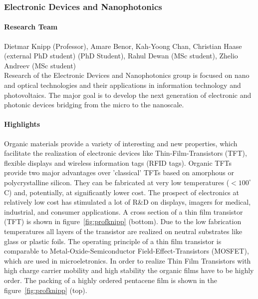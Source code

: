 \subsubsection{Electronic Devices and Nanophotonics}

\paragraph{Research Team}
Dietmar Knipp (Professor), Amare Benor, Kah-Yoong Chan, Christian Haase (external PhD
student)  (PhD Student), Rahul Dewan (MSc student), Zhelio Andreev (MSc student)\\

Research of the Electronic Devices and Nanophotonics group is focused on nano and optical technologies
 and their applications in information technology and photovoltaics. The major goal is to develop the next generation of electronic and photonic devices bridging from the micro to the nanoscale.

\paragraph{Highlights}

Organic materials provide a variety of interesting and new properties, which facilitate
the realization of electronic devices like Thin-Film-Transistors (TFT), flexible displays
and wireless information tags (RFID tags). Organic TFTs provide two major advantages over
'classical' TFTs based on amorphous or polycrystalline silicon. They can be fabricated at
very low temperatures ($<100^\circ$ C) and, potentially, at significantly lower cost. The
prospect of electronics at relatively low cost has stimulated a lot of R\&D on displays,
imagers for medical, industrial, and consumer applications.  A cross section of a thin
film transistor (TFT) is shown in figure~\ref{fig:profknipp} (bottom). Due to the low
fabrication temperatures all layers of the transistor are realized on neutral substrates
like glass or plastic foils. The operating principle of a thin film transistor is
comparable to Metal-Oxide-Semiconductor Field-Effect-Transistors (MOSFET), which are used
in microeletronics. In order to realize Thin Film Transistors with high charge carrier
mobility and high stability the organic films have to be highly order. The packing of a
highly ordered pentacene film is shown in the figure~\ref{fig:profknipp} (top).


